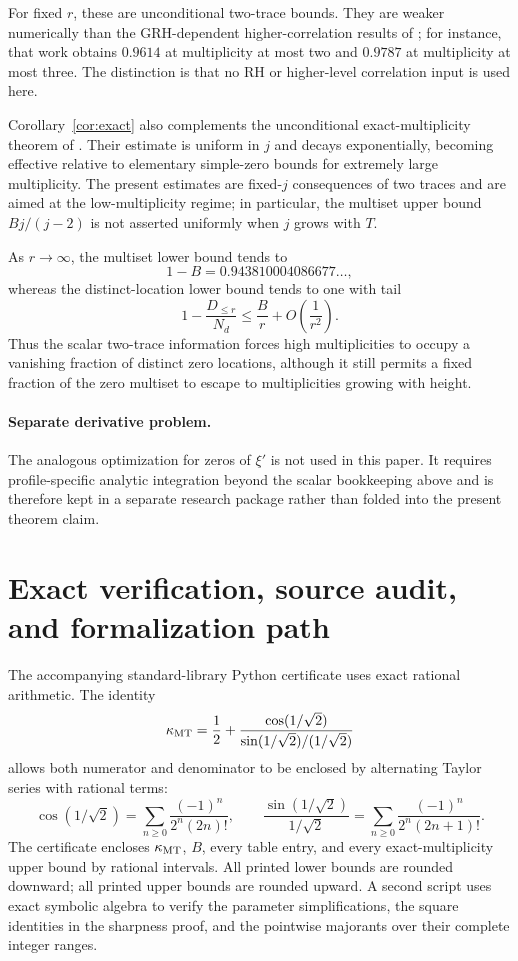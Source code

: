 For fixed $r$, these are unconditional two-trace bounds.  They are weaker numerically than the GRH-dependent higher-correlation results of \cite{GDL2025}; for instance, that work obtains $0.9614$ at multiplicity at most two and $0.9787$ at multiplicity at most three.  The distinction is that no RH or higher-level correlation input is used here.

Corollary~\ref{cor:exact} also complements the unconditional exact-multiplicity theorem of \cite{STTB2022}.  Their estimate is uniform in $j$ and decays exponentially, becoming effective relative to elementary simple-zero bounds for extremely large multiplicity.  The present estimates are fixed-$j$ consequences of two traces and are aimed at the low-multiplicity regime; in particular, the multiset upper bound $Bj/(j-2)$ is not asserted uniformly when $j$ grows with $T$.

As $r\to\infty$, the multiset lower bound tends to
\[
1-B=0.943810004086677\ldots,
\]
whereas the distinct-location lower bound tends to one with tail
\[
1-\frac{D_{\leq r}}{N_d}
\leq \frac{B}{r}+O\!\left(\frac1{r^2}\right).
\]
Thus the scalar two-trace information forces high multiplicities to occupy a vanishing fraction of distinct zero locations, although it still permits a fixed fraction of the zero multiset to escape to multiplicities growing with height.

\paragraph{Separate derivative problem.}
The analogous optimization for zeros of $\xi'$ is not used in this paper.  It requires profile-specific analytic integration beyond the scalar bookkeeping above and is therefore kept in a separate research package rather than folded into the present theorem claim.

\section{Exact verification, source audit, and formalization path}\label{sec:verification}

The accompanying standard-library Python certificate uses exact rational arithmetic.  The identity
\[
\kappa_{\mathrm{MT}}=\frac12+\frac{\cos(1/\sqrt2)}{\sin(1/\sqrt2)/(1/\sqrt2)}
\]
allows both numerator and denominator to be enclosed by alternating Taylor series with rational terms:
\[
\cos(1/\sqrt2)=\sum_{n\geq0}\frac{(-1)^n}{2^n(2n)!},
\qquad
\frac{\sin(1/\sqrt2)}{1/\sqrt2}
=\sum_{n\geq0}\frac{(-1)^n}{2^n(2n+1)!}.
\]
The certificate encloses $\kappa_{\mathrm{MT}}$, $B$, every table entry, and every exact-multiplicity upper bound by rational intervals.  All printed lower bounds are rounded downward; all printed upper bounds are rounded upward.  A second script uses exact symbolic algebra to verify the parameter simplifications, the square identities in the sharpness proof, and the pointwise majorants over their complete integer ranges.

